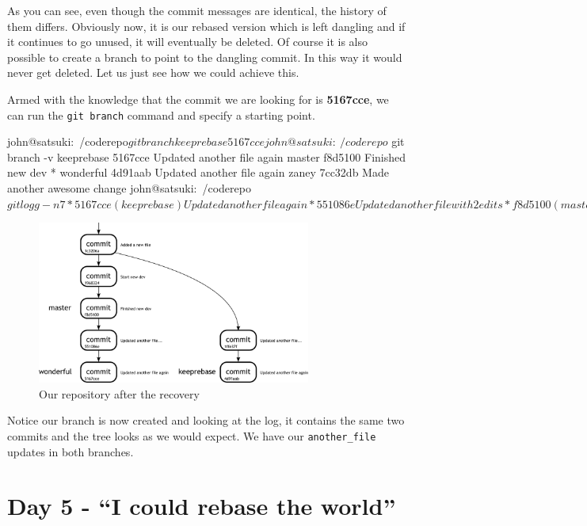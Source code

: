 As you can see, even though the commit messages are identical, the history of them differs.
Obviously now, it is our rebased version which is left dangling and if it continues to go unused, it will eventually be deleted.
Of course it is also possible to create a branch to point to the dangling commit.
In this way it would never get deleted.
Let us just see how we could achieve this.

Armed with the knowledge that the commit we are looking for is \textbf{5167cce}, we can run the \texttt{git branch} command and specify a starting point.

\begin{code}
john@satsuki:~/coderepo$ git branch keeprebase 5167cce
john@satsuki:~/coderepo$ git branch -v
  keeprebase 5167cce Updated another file again
  master     f8d5100 Finished new dev
* wonderful  4d91aab Updated another file again
  zaney      7cc32db Made another awesome change
john@satsuki:~/coderepo$ git logg -n7
* 5167cce (keeprebase) Updated another file again
* 551086e Updated another file with 2 edits
* f8d5100 (master) Finished new dev
* 1968324 Start new dev
| * 4d91aab (HEAD, wonderful) Updated another file again
| * 1ffe37f Updated another file with 2 edits
|/
* 1c3206a Added a new file
john@satsuki:~/coderepo$
\end{code}

\begin{figure}[hbt]
\centering
\includegraphics[width=9cm]{images/f-w7-d7.pdf}
\caption{Our repository after the recovery}
\end{figure}

Notice our branch is now created and looking at the log, it contains the same two commits and the tree looks as we would expect.
We have our \texttt{another\_file} updates in both branches.

\section{Day 5 - ``I could rebase the world''}
